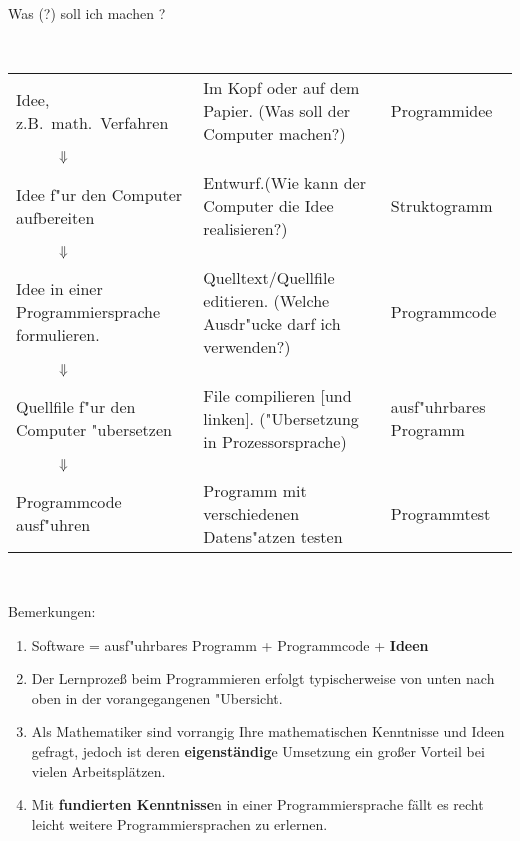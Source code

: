 \centerline {\Large Was (?) soll ich machen ?}
\mbox{}\\[1ex]
%
\begin{tabular}{p{}@{\qquad}p{}@{\qquad}p{}}
 Idee, z.B.\   math.\  Verfahren & Im Kopf oder auf dem Papier. \newline(Was soll der Computer machen?) & Programmidee \\
 $\hspace{0.09\textwidth}\Downarrow$  \\
%
 Idee f"ur den Computer aufbereiten &
 	Entwurf.\newline (Wie kann der Computer die Idee realisieren?) & Struktogramm \\
 $\hspace{0.09\textwidth}\Downarrow$  \\
%
 Idee in einer Pro\-grammier\-sprache formulieren.
  & Quelltext/Quellfile  editieren.\newline
   (Welche Ausdr"ucke darf ich verwenden?) & Programmcode \\
  $\hspace{0.09\textwidth}\Downarrow$  \\
%
 Quellfile f"ur den Computer "ubersetzen
  & File compilieren [und linken]. \newline("Ubersetzung in Prozessorsprache)
  & ausf"uhrbares Programm
  \\
 $\hspace{0.09\textwidth}\Downarrow$  \\
%
 Programmcode ausf"uhren
 & Programm mit verschiedenen Datens"atzen testen
 & Programmtest
\end{tabular}
\\[2ex]

\begin{samepage}
Bemerkungen:
\begin{enumerate}
 \item Software = ausf"uhrbares Programm + Programmcode  + \textbf{Ideen}
 \item Der Lernproze{\ss}  beim Programmieren erfolgt typischerweise von
 unten nach oben in der vorangegangenen "Ubersicht.
 \item Als Mathematiker sind vorrangig Ihre mathematischen Kenntnisse und Ideen gefragt,
   jedoch ist deren \textbf{eigenständig}e Umsetzung ein großer Vorteil bei vielen
   Arbeitsplätzen.
 \item Mit \textbf{fundierten Kenntnisse}n in einer Programmiersprache fällt es recht leicht 
 weitere Programmiersprachen zu erlernen.
\end{enumerate}
\end{samepage}

